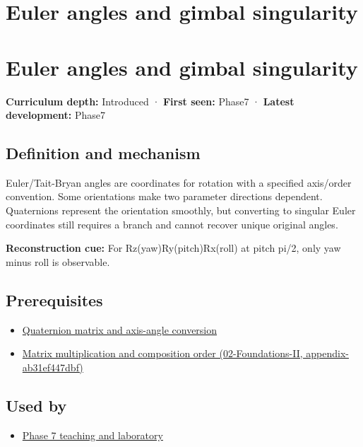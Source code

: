 \hypertarget{appendix-5f723fbd0593}{}
\section*{Euler angles and gimbal singularity}
\section{Euler angles and gimbal singularity}\label{euler-angles-and-gimbal-singularity}

\textbf{Curriculum depth:} Introduced · \textbf{First seen:} Phase7 · \textbf{Latest development:} Phase7

\subsection{Definition and mechanism}\label{definition-and-mechanism}

Euler/Tait-Bryan angles are coordinates for rotation with a specified axis/order convention. Some orientations make two parameter directions dependent. Quaternions represent the orientation smoothly, but converting to singular Euler coordinates still requires a branch and cannot recover unique original angles.

\textbf{Reconstruction cue:} For Rz(yaw)Ry(pitch)Rx(roll) at pitch pi/2, only yaw minus roll is observable.

\subsection{Prerequisites}\label{prerequisites}

\begin{itemize}
\tightlist
\item
  \hyperref[appendix-26d8da71f6c4]{Quaternion matrix and axis-angle conversion}
\item
  \href{}{Matrix multiplication and composition order (02-Foundations-II, appendix-ab31ef447dbf)}
\end{itemize}

\subsection{Used by}\label{used-by}

\begin{itemize}
\tightlist
\item
  \href{Continuous\%20Notes/Computing\%20Foundations\%20-\%20From\%20Bits\%20to\%20C++\%20and\%20Systems\%20APIs\#Keep\%20the\%20promises\%20visible\%20while\%20moving\%20between\%20representations}{Phase 7 teaching and laboratory}
\end{itemize}

